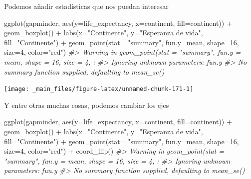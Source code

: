 \documentclass[
]{book}
\newenvironment{Shaded}{\begin{snugshade}}{\end{snugshade}}
\newcommand{\AttributeTok}[1]{\textcolor[rgb]{0.77,0.63,0.00}{#1}}
\newcommand{\CommentTok}[1]{\textcolor[rgb]{0.56,0.35,0.01}{\textit{#1}}}
\newcommand{\DecValTok}[1]{\textcolor[rgb]{0.00,0.00,0.81}{#1}}
\newcommand{\FunctionTok}[1]{\textcolor[rgb]{0.00,0.00,0.00}{#1}}
\newcommand{\NormalTok}[1]{#1}
\newcommand{\SpecialCharTok}[1]{\textcolor[rgb]{0.00,0.00,0.00}{#1}}
\newcommand{\StringTok}[1]{\textcolor[rgb]{0.31,0.60,0.02}{#1}}
\begin{document}
Podemos añadir estadísticas que nos puedan interesar

\begin{Shaded}
\begin{Highlighting}[]
\FunctionTok{ggplot}\NormalTok{(gapminder, }\FunctionTok{aes}\NormalTok{(}\AttributeTok{y=}\NormalTok{life\_expectancy, }\AttributeTok{x=}\NormalTok{continent, }\AttributeTok{fill=}\NormalTok{continent)) }\SpecialCharTok{+}
  \FunctionTok{geom\_boxplot}\NormalTok{() }\SpecialCharTok{+}
  \FunctionTok{labs}\NormalTok{(}\AttributeTok{x=}\StringTok{"Continente"}\NormalTok{, }\AttributeTok{y=}\StringTok{"Esperanza de vida"}\NormalTok{, }\AttributeTok{fill=}\StringTok{"Continente"}\NormalTok{) }\SpecialCharTok{+}  
\FunctionTok{geom\_point}\NormalTok{(}\AttributeTok{stat=} \StringTok{"summary"}\NormalTok{, }\AttributeTok{fun.y=}\NormalTok{mean, }\AttributeTok{shape=}\DecValTok{16}\NormalTok{, }\AttributeTok{size=}\DecValTok{4}\NormalTok{, }\AttributeTok{color=}\StringTok{"red"}\NormalTok{)}
\CommentTok{\#\textgreater{} Warning in geom\_point(stat = "summary", fun.y = mean, shape = 16, size = 4, :}
\CommentTok{\#\textgreater{} Ignoring unknown parameters: \textasciigrave{}fun.y\textasciigrave{}}
\CommentTok{\#\textgreater{} No summary function supplied, defaulting to \textasciigrave{}mean\_se()\textasciigrave{}}
\end{Highlighting}
\end{Shaded}

\begin{center}\texttt{[image: \_main\_files/figure-latex/unnamed-chunk-171-1]} \end{center}

Y entre otras muchas cosas, podemos cambiar los ejes

\begin{Shaded}
\begin{Highlighting}[]
\FunctionTok{ggplot}\NormalTok{(gapminder, }\FunctionTok{aes}\NormalTok{(}\AttributeTok{y=}\NormalTok{life\_expectancy, }\AttributeTok{x=}\NormalTok{continent, }\AttributeTok{fill=}\NormalTok{continent)) }\SpecialCharTok{+}
  \FunctionTok{geom\_boxplot}\NormalTok{() }\SpecialCharTok{+}
  \FunctionTok{labs}\NormalTok{(}\AttributeTok{x=}\StringTok{"Continente"}\NormalTok{, }\AttributeTok{y=}\StringTok{"Esperanza de vida"}\NormalTok{, }\AttributeTok{fill=}\StringTok{"Continente"}\NormalTok{) }\SpecialCharTok{+}  
\FunctionTok{geom\_point}\NormalTok{(}\AttributeTok{stat=} \StringTok{"summary"}\NormalTok{, }\AttributeTok{fun.y=}\NormalTok{mean, }\AttributeTok{shape=}\DecValTok{16}\NormalTok{, }\AttributeTok{size=}\DecValTok{4}\NormalTok{, }\AttributeTok{color=}\StringTok{"red"}\NormalTok{) }\SpecialCharTok{+}
  \FunctionTok{coord\_flip}\NormalTok{()}
\CommentTok{\#\textgreater{} Warning in geom\_point(stat = "summary", fun.y = mean, shape = 16, size = 4, :}
\CommentTok{\#\textgreater{} Ignoring unknown parameters: \textasciigrave{}fun.y\textasciigrave{}}
\CommentTok{\#\textgreater{} No summary function supplied, defaulting to \textasciigrave{}mean\_se()\textasciigrave{}}
\end{Highlighting}
\end{Shaded}
\end{document}
